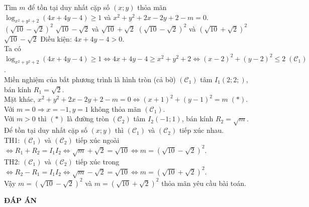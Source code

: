 \begin{ex}%
Tìm $m$ để tồn tại duy nhất cặp số $(x;y)$ thỏa mãn $\log_{x^2+y^2+2}(4x+4y-4)\geq 1$ và $x^2+y^2+2x-2y+2-m=0$.
\choice
{$\left(\sqrt{10}-\sqrt{2}\right)^2$}
{$\sqrt{10}-\sqrt{2}$ và $\sqrt{10}+\sqrt{2}$}
{\True $\left(\sqrt{10}-\sqrt{2}\right)^2$ và $\left(\sqrt{10}+\sqrt{2}\right)^2$}
{$\sqrt{10}-\sqrt{2}$}
\loigiai
{
Điều kiện: $4x+4y-4>0$.\\Ta có $\log_{x^2+y^2+2}(4x+4y-4)\geq 1\Leftrightarrow 4x+4y-4\geq x^2+y^2+2\Leftrightarrow (x-2)^2+(y-2)^2\leq 2\;(\mathscr{C}_1)$.\\Miền nghiệm của bất phương trình là hình tròn (cả bờ) $(\mathscr{C}_1)$ tâm $I_1(2;2;)$, bán kính $R_1=\sqrt{2}$.\\Mặt khác, $x^2+y^2+2x-2y+2-m=0\Leftrightarrow (x+1)^2+(y-1)^2=m\;(*)$.\\Với $m=0\Rightarrow x=-1, y=1$ không thỏa mãn $(\mathscr{C}_1)$.\\Với $m>0$ thì $(*)$ là đường tròn $(\mathscr{C}_2)$ tâm $I_2(-1;1)$, bán kính $R_2=\sqrt{m}$.\\Để tồn tại duy nhất cặp số $(x;y)$ thì $(\mathscr{C}_1)$ và $(\mathscr{C}_2)$ tiếp xúc nhau.\\TH1: $(\mathscr{C}_1)$ và $(\mathscr{C}_2)$ tiếp xúc ngoài $\Leftrightarrow R_1+R_2=I_1I_2\Leftrightarrow\sqrt{m}+\sqrt{2}=\sqrt{10}\Leftrightarrow m=\left(\sqrt{10}-\sqrt{2}\right)^2$.\\
TH2: $(\mathscr{C}_1)$ và $(\mathscr{C}_2)$ tiếp xúc trong $\Leftrightarrow R_2-R_1=I_1I_2\Leftrightarrow\sqrt{m}-\sqrt{2}=\sqrt{10}\Leftrightarrow m=\left(\sqrt{10}+\sqrt{2}\right)^2$.\\
Vậy $m=\left(\sqrt{10}-\sqrt{2}\right)^2$ và $m=\left(\sqrt{10}+\sqrt{2}\right)^2$ thỏa mãn yêu cầu bài toán.
}
\end{ex}
\newpage
\begin{center}
	\textbf{ĐÁP ÁN}
\end{center}
\begin{multicols}{10}
	 
\end{multicols}
